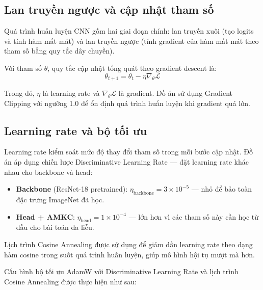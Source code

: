 \subsection{Lan truyền ngược và cập nhật tham số}

Quá trình huấn luyện CNN gồm hai giai đoạn chính: lan truyền xuôi (tạo logits và tính hàm mất mát) và lan truyền ngược (tính gradient của hàm mất mát theo tham số bằng quy tắc dây chuyền).

Với tham số $\theta$, quy tắc cập nhật tổng quát theo gradient descent là:
\begin{equation}
  \theta_{t+1}=\theta_t-\eta\nabla_\theta\mathcal{L}
\end{equation}

Trong đó, $\eta$ là learning rate và $\nabla_\theta\mathcal{L}$ là gradient. Đồ án sử dụng Gradient Clipping với ngưỡng 1.0 để ổn định quá trình huấn luyện khi gradient quá lớn.

\subsection{Learning rate và bộ tối ưu}

Learning rate kiểm soát mức độ thay đổi tham số trong mỗi bước cập nhật. Đồ án áp dụng chiến lược Discriminative Learning Rate --- đặt learning rate khác nhau cho backbone và head:
\begin{itemize}
  \item \textbf{Backbone} (ResNet-18 pretrained): $\eta_{\text{backbone}}=3\times10^{-5}$ --- nhỏ để bảo toàn đặc trưng ImageNet đã học.
  \item \textbf{Head + AMKC}: $\eta_{\text{head}}=1\times10^{-4}$ --- lớn hơn vì các tham số này cần học từ đầu cho bài toán da liễu.
\end{itemize}

Lịch trình Cosine Annealing được sử dụng để giảm dần learning rate theo dạng hàm cosine trong suốt quá trình huấn luyện, giúp mô hình hội tụ mượt mà hơn.

Cấu hình bộ tối ưu AdamW với Discriminative Learning Rate và lịch trình Cosine Annealing được thực hiện như sau:

